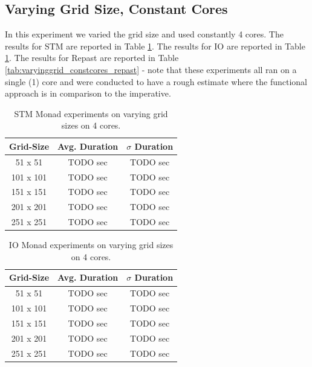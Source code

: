 \subsection{Varying Grid Size, Constant Cores}
In this experiment we varied the grid size and used constantly 4 cores. The results for STM are reported in Table \ref{tab:varyinggrid_constcores_stm}. The results for IO are reported in Table \ref{tab:varyinggrid_constcores_stm}. The results for Repast are reported in Table \ref{tab:varyinggrid_constcores_repast} - note that these experiments all ran on a single (1) core and were conducted to have a rough estimate where the functional approach is in comparison to the imperative.

\begin{table}
	\centering
  	\begin{tabular}{ c || c | c }
        Grid-Size & Avg. Duration & $\sigma$ Duration \\ \hline \hline 
   		51 x 51   & TODO sec & TODO sec \\ \hline
   		101 x 101 & TODO sec & TODO sec \\ \hline
   		151 x 151 & TODO sec & TODO sec \\ \hline
   		201 x 201 & TODO sec & TODO sec \\ \hline 
   		251 x 251 & TODO sec & TODO sec \\ \hline
  	\end{tabular}
  	
  	\caption{STM Monad experiments on varying grid sizes on 4 cores.}
	\label{tab:varyinggrid_constcores_stm}
\end{table}

\begin{table}
	\centering
  	\begin{tabular}{ c || c | c }
        Grid-Size & Avg. Duration & $\sigma$ Duration \\ \hline \hline 
   		51 x 51   & TODO sec & TODO sec \\ \hline
   		101 x 101 & TODO sec & TODO sec \\ \hline
   		151 x 151 & TODO sec & TODO sec \\ \hline
   		201 x 201 & TODO sec & TODO sec \\ \hline 
   		251 x 251 & TODO sec & TODO sec \\ \hline 
  	\end{tabular}
  	
  	\caption{IO Monad experiments on varying grid sizes on 4 cores.}
	\label{tab:varyinggrid_constcores_IO}
\end{table}

